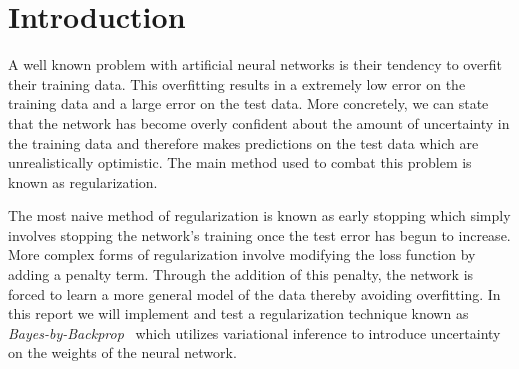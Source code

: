 \documentclass[11pt]{article}
\begin{document}
\setcounter{section}{0}
\thispagestyle{empty}

\noindent{}
\bigskip

\newcommand\Ind{{\mathbb{I}}}
\newcommand\Exp{{\mathbb{E}}}
\newcommand\KL{{\operatorname{KL}}}

\section{Introduction}

A well known problem with artificial neural networks is their tendency to 
overfit their training data. This overfitting results in a extremely low 
error on the training data and a large error on the test data. More concretely,
we can state that the network has become overly confident about the amount of
uncertainty in the training data and therefore makes predictions on the test
data which are unrealistically optimistic. The main method used to combat 
this problem is known as regularization. 

The most naive method of regularization is known as early stopping which simply
involves stopping the network's training once the test error has begun to
increase. More complex forms of regularization involve modifying the loss
function by adding a penalty term. Through the addition of this penalty, the
network is forced to learn a more general model of the data thereby avoiding
overfitting. In this report we will implement and test a regularization
technique known as \textit{Bayes-by-Backprop}~\cite{blundell} which utilizes
variational inference to introduce uncertainty on the weights of the neural
network.
\end{document}
